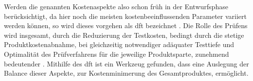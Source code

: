     \vspace{\fsize}

    Werden die genannten Kostenaspekte also schon früh in der Entwurfsphase berücksichtigt, da hier noch die meisten kostenbeeinflussenden Parameter variiert werden können, so wird dieses vorgehen als \acl{dft} bezeichnet \cite{eggersglus_test_2014}.
    Die Rolle des Prüfens wird insgesamt, durch die Reduzierung der Testkosten, bedingt durch die stetige Produktkostenabnahme, bei gleichzeitig notwendiger adäquater Testtiefe und Optimalität des Prüfverfahrens für die jeweilige Produktsparte, zunehmend bedeutender \cite{grout_integrated_2006}.
    Mithilfe des \ac{dft} ist ein Werkzeug gefunden, dass eine Auslegung der Balance dieser Aspekte, zur Kostenminimerung des Gesamtproduktes, ermöglicht.
